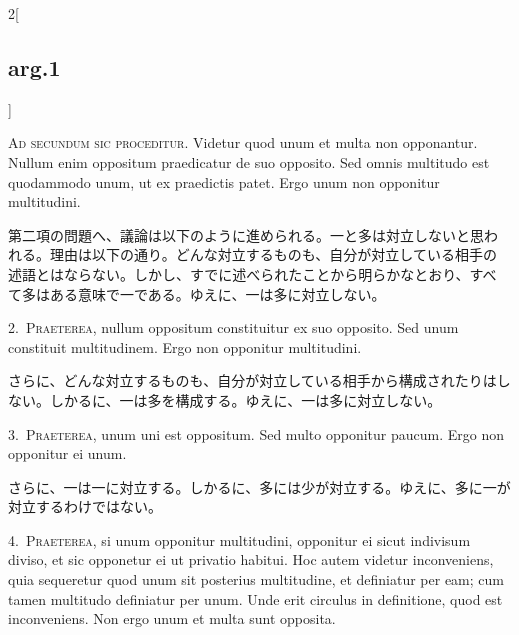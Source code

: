 \documentclass[paper=a4paper,fontsize=10pt,jafontsize=9pt,titlepage]{jlreq}
\begin{document}
{}
\setcounter{section}{2}
\setcounter{subsection}{0}

\begin{paracol}{2}[\subsection{arg.1}]

{\huge A}{\scshape d secundum sic proceditur}. Videtur quod unum et multa non
opponantur. Nullum enim oppositum praedicatur de suo opposito. Sed omnis
multitudo est quodammodo unum, ut ex praedictis patet. Ergo unum non
opponitur multitudini.

\switchcolumn

第二項の問題へ、議論は以下のように進められる。一と多は対立しないと思わ
れる。理由は以下の通り。どんな対立するものも、自分が対立している相手の
述語とはならない。しかし、すでに述べられたことから明らかなとおり、すべ
て多はある意味で一である。ゆえに、一は多に対立しない。


2.~{\scshape Praeterea}, nullum oppositum constituitur ex suo opposito. Sed unum
constituit multitudinem. Ergo non opponitur multitudini.

\switchcolumn

さらに、どんな対立するものも、自分が対立している相手から構成されたりはし
ない。しかるに、一は多を構成する。ゆえに、一は多に対立しない。


3.~{\scshape Praeterea}, unum uni est oppositum. Sed multo opponitur paucum. Ergo non opponitur ei unum.

\switchcolumn

さらに、一は一に対立する。しかるに、多には少が対立する。ゆえに、多に一が
対立するわけではない。


4.~{\scshape Praeterea}, si unum opponitur multitudini, opponitur ei sicut indivisum
diviso, et sic opponetur ei ut privatio habitui. Hoc autem videtur
inconveniens, quia sequeretur quod unum sit posterius multitudine, et
definiatur per eam; cum tamen multitudo definiatur per unum. Unde erit
circulus in definitione, quod est inconveniens. Non ergo unum et multa
sunt opposita.


\end{paracol}
\end{document}
